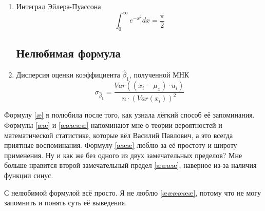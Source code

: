 \documentclass[12pt, a4paper]{article}
\begin{document}
\begin{enumerate}
\item Интеграл Эйлера-Пуассона 
\begin{equation}
\int_0^{\infty} e^{-x^2} dx = \frac{\pi}{2} \tag{æææææ}
\end{equation}

\subsection{Нелюбимая формула}

\item Дисперсия оценки коэффициента $\hat \beta_1$, полученной МНК
\begin{equation}
\sigma_{\hat \beta_1} = \frac {Var((x_i - \mu_x)\cdot u_i)}{n \cdot (Var (x_i))^2} \tag{ææææææ}
\end{equation}
\end{enumerate}

 Формулу \ref{æ} я полюбила после того, как узнала лёгкий способ её запоминания. 
 Формулы \ref{ææ} и \ref{æææææ} напоминают мне о теории вероятностей и математической статистике, которые вёл Василий Павлович, а это всегда приятные воспоминания.
  Формулу \ref{æææ} люблю за её простоту и широту применения. 
Ну и как же без одного из двух замечательных пределов? Мне больше нравится второй замечательный предел \ref{ææææ}, наверное из-за наличия функции синус. 

С нелюбимой формулой всё просто. Я не люблю \ref{ææææææ}, потому что не могу запомнить и понять суть её выведения. 
\end{document}
